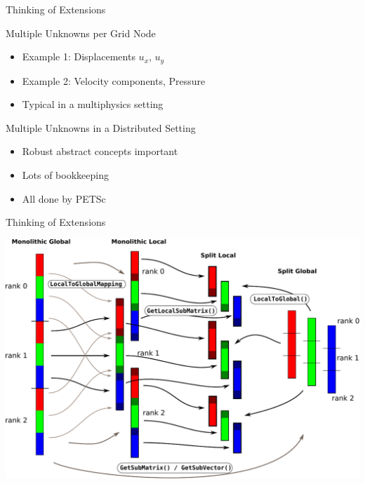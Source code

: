 \begin{frame}[fragile]{Thinking of Extensions}

\begin{block}{Multiple Unknowns per Grid Node}
  \begin{itemize}
   \item Example 1: Displacements $u_x$, $u_y$
   \item Example 2: Velocity components, Pressure
   \item Typical in a multiphysics setting
  \end{itemize}
\end{block}

\begin{block}{Multiple Unknowns in a Distributed Setting}
  \begin{itemize}
   \item Robust abstract concepts important
   \item Lots of bookkeeping
   \item All done by PETSc
  \end{itemize}

\end{block}

\end{frame}


\begin{frame}[fragile]{Thinking of Extensions}

\begin{center}
 \includegraphics[width=\textwidth]{figures/localspaces}
\end{center}


\end{frame}
